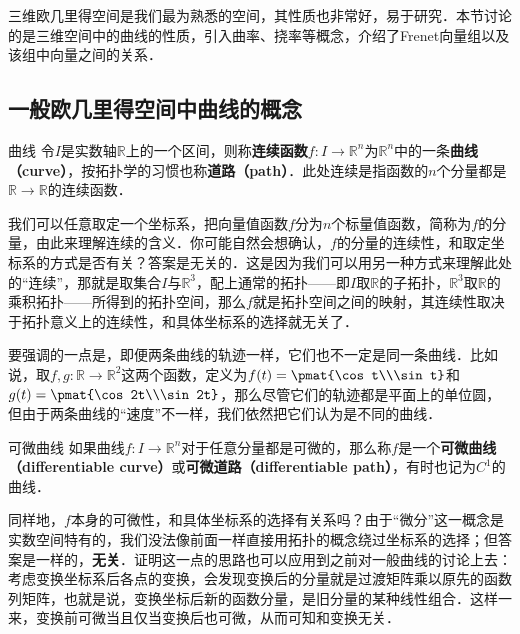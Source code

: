 

三维欧几里得空间是我们最为熟悉的空间，其性质也非常好，易于研究．本节讨论的是三维空间中的曲线的性质，引入曲率、挠率等概念，介绍了Frenet向量组以及该组中向量之间的关系．

\subsection{一般欧几里得空间中曲线的概念}

\begin{definition}{曲线}
令$I$是实数轴$\mathbb{R}$上的一个区间，则称\textbf{连续函数}$f:I\to \mathbb{R}^n$为$\mathbb{R}^n$中的一条\textbf{曲线（curve）}，按拓扑学的习惯也称\textbf{道路（path）}．此处连续是指函数的$n$个分量都是$\mathbb{R}\to\mathbb{R}$的连续函数．
\end{definition}

我们可以任意取定一个坐标系，把向量值函数$f$分为$n$个标量值函数，简称为$f$的分量，由此来理解连续的含义．你可能自然会想确认，$f$的分量的连续性，和取定坐标系的方式是否有关？答案是无关的．这是因为我们可以用另一种方式来理解此处的“连续”，那就是取集合$I$与$\mathbb{R}^3$，配上通常的拓扑——即$I$取$\mathbb{R}$的子拓扑，$\mathbb{R}^3$取$\mathbb{R}$的乘积拓扑——所得到的拓扑空间，那么$f$就是拓扑空间之间的映射，其连续性取决于拓扑意义上的连续性，和具体坐标系的选择就无关了．

要强调的一点是，即便两条曲线的轨迹一样，它们也不一定是同一条曲线．比如说，取$f, g:\mathbb{R}\to\mathbb{R}^2$这两个函数，定义为$f(t)=\pmat{\cos t\\\sin t}$和$g(t)=\pmat{\cos 2t\\\sin 2t}$，那么尽管它们的轨迹都是平面上的单位圆，但由于两条曲线的“速度”不一样，我们依然把它们认为是不同的曲线．

\begin{definition}{可微曲线}
如果曲线$f:I\to\mathbb{R}^n$对于任意分量都是可微的，那么称$f$是一个\textbf{可微曲线（differentiable curve）}或\textbf{可微道路（differentiable path）}，有时也记为$C^1$的曲线．
\end{definition}

同样地，$f$本身的可微性，和具体坐标系的选择有关系吗？由于“微分”这一概念是实数空间特有的，我们没法像前面一样直接用拓扑的概念绕过坐标系的选择；但答案是一样的，\textbf{无关}．证明这一点的思路也可以应用到之前对一般曲线的讨论上去：考虑变换坐标系后各点的变换，会发现变换后的分量就是过渡矩阵乘以原先的函数列矩阵，也就是说，变换坐标后新的函数分量，是旧分量的某种线性组合．这样一来，变换前可微当且仅当变换后也可微，从而可知和变换无关．

